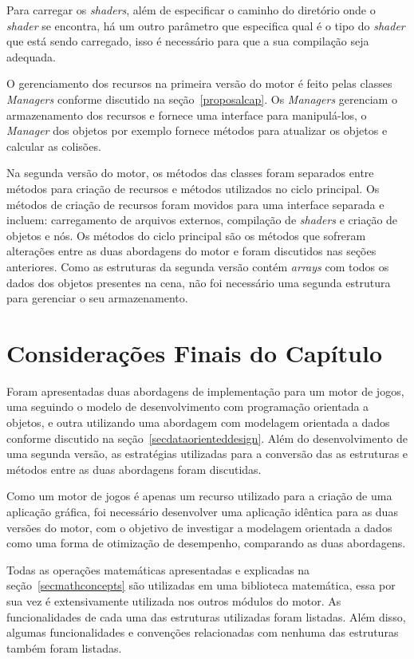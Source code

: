 Para carregar os \textit{shaders}, além de especificar o caminho do diretório onde o 
\textit{shader} se encontra, há um outro parâmetro que especifica qual é o tipo do 
\textit{shader} que está sendo carregado, isso é necessário para que a sua compilação 
seja adequada.

O gerenciamento dos recursos na primeira versão do motor é feito pelas classes 
\textit{Managers} conforme discutido na seção~\ref{proposalcap}. Os \textit{Managers}
gerenciam o armazenamento dos recursos e fornece uma interface para manipulá-los, 
o \textit{Manager} dos objetos por exemplo fornece métodos para atualizar os 
objetos e calcular as colisões.

Na segunda versão do motor, os métodos das classes foram separados 
entre métodos para criação de recursos e métodos utilizados no ciclo 
principal. Os métodos de criação de recursos foram movidos para uma 
interface separada e incluem: carregamento 
de arquivos externos, compilação de \textit{shaders} e criação de 
objetos e nós. Os métodos do ciclo principal são os métodos que 
sofreram alterações entre as duas abordagens do motor e foram 
discutidos nas seções anteriores. Como as estruturas da segunda 
versão contém \textit{arrays} com todos os dados dos objetos 
presentes na cena, não foi necessário uma segunda estrutura 
para gerenciar o seu armazenamento.

\section{Considerações Finais do Capítulo}

Foram apresentadas duas abordagens de implementação para 
um motor de jogos, uma seguindo o modelo de desenvolvimento 
com programação orientada a objetos, e outra utilizando uma 
abordagem com modelagem orientada a dados conforme discutido 
na seção~\ref{secdataorienteddesign}.
Além do desenvolvimento de uma segunda versão, as estratégias 
utilizadas para a conversão das as estruturas e métodos entre 
as duas abordagens foram discutidas.

Como um motor de jogos é apenas um recurso utilizado para a criação de uma aplicação 
gráfica, foi necessário desenvolver uma aplicação idêntica para as 
duas versões do motor, com o objetivo de investigar a 
modelagem orientada a dados como uma forma de otimização de 
desempenho, comparando as duas abordagens.

Todas as operações matemáticas apresentadas e explicadas na seção~\ref{secmathconcepts} 
são utilizadas em uma biblioteca matemática, essa por sua vez é extensivamente 
utilizada nos outros módulos do motor. As funcionalidades de cada uma das estruturas 
utilizadas foram listadas. Além disso, algumas funcionalidades e convenções 
relacionadas com nenhuma das estruturas também foram listadas.

